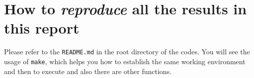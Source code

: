 \section{How to \emph{reproduce} all the results in this report}

Please refer to the \verb|README.md| in the root directory of the codes. You will see the usage of \verb|make|, which helps you how to establish the same working environment and then to execute and also there are other functions. 